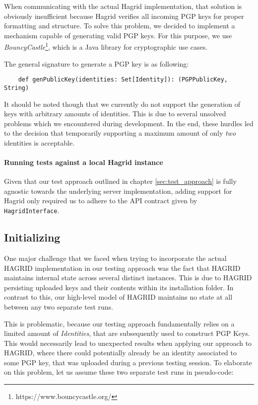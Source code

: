 When communicating with the actual Hagrid implementation, that solution is obviously insufficient because Hagrid verifies all incoming PGP keys for proper formatting and structure. To solve this problem, we decided to implement a mechanism capable of generating valid PGP keys. 
For this purpose, we use \emph{BouncyCastle}\footnote{https://www.bouncycastle.org/}, which is a Java library for cryptographic use cases.

The general signature to generate a PGP key is as following: 
\begin{verbatim}
    def genPublicKey(identities: Set[Identity]): (PGPPublicKey, String)
\end{verbatim}
It should be noted though that we currently do not support the generation of keys with arbitrary amounts of identities. This is due to several unsolved problems which we encountered during development. In the end, these hurdles led to the decision that temporarily supporting a maximum amount of only \emph{two} identities is acceptable.
\paragraph{Running tests against a local Hagrid instance} Given that our test approach outlined in chapter \ref{sec:test_approach} is fully agnostic towards the underlying server implementation, adding support for Hagrid only required us to adhere to the API contract given by \texttt{HagridInterface}.
\subsection{Initializing}
One major challenge that we faced when trying to incorporate the actual HAGRID implementation in our testing approach was the fact that HAGRID maintains internal state across several distinct instances. This is due to HAGRID persisting uploaded keys and their contents within its installation folder. 
In contrast to this, our high-level model of HAGRID maintains no state at all between any two separate test runs.

This is problematic, because our testing approach fundamentally relies on a limited amount of \emph{Identities}, that are subsequently used to construct PGP Keys. This would necessarily lead to unexpected results when applying our approach to HAGRID, where there could potentially already be an identity associated to some PGP key, that was uploaded during a previous testing session. 
To elaborate on this problem, let us assume these two separate test runs in pseudo-code:

